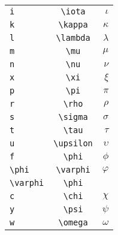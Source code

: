 \documentclass[a4paper,11pt]{scrartcl}
\begin{document}
\begin{table}[tb]
\begin{center}
\begin{tabular}{lcr}
    \verb|i|                     &    \verb|\iota|                                                &    $\iota$  \\
    \verb|k|                     &    \verb|\kappa|                                               &    $\kappa$  \\
    \verb|l|                     &    \verb|\lambda|                                              &    $\lambda$  \\
    \verb|m|                     &    \verb|\mu|                                                  &    $\mu$  \\
    \verb|n|                     &    \verb|\nu|                                                  &    $\nu$  \\
    \verb|x|                     &    \verb|\xi|                                                  &    $\xi$  \\
    \verb|p|                     &    \verb|\pi|                                                  &    $\pi$  \\
    \verb|r|                     &    \verb|\rho|                                                 &    $\rho$  \\
    \verb|s|                     &    \verb|\sigma|                                               &    $\sigma$  \\
    \verb|t|                     &    \verb|\tau|                                                 &    $\tau$  \\
    \verb|u|                     &    \verb|\upsilon|                                             &    $\upsilon$  \\
    \verb|f|                     &    \verb|\phi|                                                 &    $\phi$  \\
    \verb|\phi|                  &    \verb|\varphi|                                              &    $\varphi$  \\
    \verb|\varphi|               &    \verb|\phi|                                                 &    \mbox{}  \\
    \verb|c|                     &    \verb|\chi|                                                 &    $\chi$  \\
    \verb|y|                     &    \verb|\psi|                                                 &    $\psi$  \\
    \verb|w|                     &    \verb|\omega|                                               &    $\omega$  \\

\end{tabular}
\end{center}
\end{table}
\end{document}
